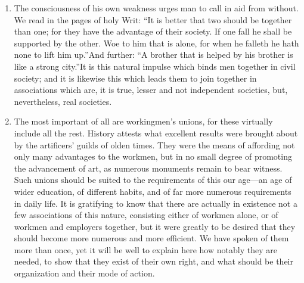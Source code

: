 \documentclass{book}
\begin{document}
\begin{enumerate}
	\item The consciousness of his own weakness urges man to call in aid from without. We read in the pages of holy Writ: “It is better that two should be together than one; for they have the advantage of their society. If one fall he shall be supported by the other. Woe to him that is alone, for when he falleth he hath none to lift him up.”\footnotemark[32] And further: “A brother that is helped by his brother is like a strong city.”\footnotemark[33] It is this natural impulse which binds men together in civil society; and it is likewise this which leads them to join together in associations which are, it is true, lesser and not independent societies, but, nevertheless, real societies.


	\item The most important of all are workingmen’s unions, for these virtually include all the rest. History attests what excellent results were brought about by the artificers’ guilds of olden times. They were the means of affording not only many advantages to the workmen, but in no small degree of promoting the advancement of art, as numerous monuments remain to bear witness. Such unions should be suited to the requirements of this our age—an age of wider education, of different habits, and of far more numerous requirements in daily life. It is gratifying to know that there are actually in existence not a few associations of this nature, consisting either of workmen alone, or of workmen and employers together, but it were greatly to be desired that they should become more numerous and more efficient. We have spoken of them more than once, yet it will be well to explain here how notably they are needed, to show that they exist of their own right, and what should be their organization and their mode of action.



\end{enumerate}
\end{document}
